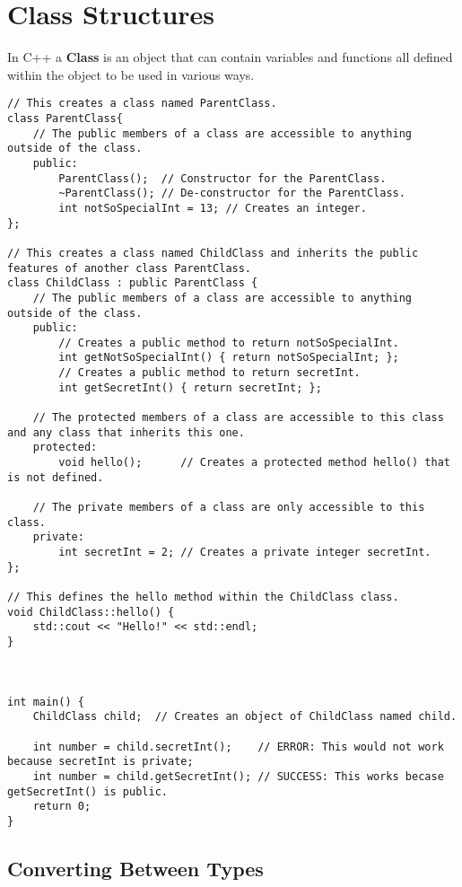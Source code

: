 \section{Class Structures}
In C++ a \textbf{Class} is an object that can contain variables and functions all defined within the object to be used in various ways.
\begin{lstlisting}
// This creates a class named ParentClass.
class ParentClass{
	// The public members of a class are accessible to anything outside of the class.
	public:
		ParentClass();  // Constructor for the ParentClass.
		~ParentClass(); // De-constructor for the ParentClass.
		int notSoSpecialInt = 13; // Creates an integer.
};

// This creates a class named ChildClass and inherits the public features of another class ParentClass.
class ChildClass : public ParentClass {
	// The public members of a class are accessible to anything outside of the class.
	public:
		// Creates a public method to return notSoSpecialInt.
		int getNotSoSpecialInt() { return notSoSpecialInt; }; 
		// Creates a public method to return secretInt.
		int getSecretInt() { return secretInt; };  
		
	// The protected members of a class are accessible to this class and any class that inherits this one.
	protected:
		void hello();      // Creates a protected method hello() that is not defined.
		
	// The private members of a class are only accessible to this class.
	private:
		int secretInt = 2; // Creates a private integer secretInt.
};

// This defines the hello method within the ChildClass class.
void ChildClass::hello() {
	std::cout << "Hello!" << std::endl;
}



int main() {
	ChildClass child;  // Creates an object of ChildClass named child.
	
	int number = child.secretInt();    // ERROR: This would not work because secretInt is private;
	int number = child.getSecretInt(); // SUCCESS: This works becase getSecretInt() is public.
	return 0;
}
\end{lstlisting}







\subsection{Converting Between Types}

